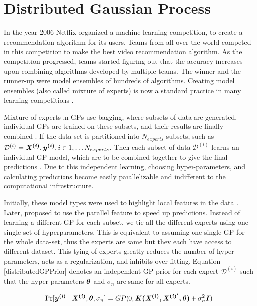 \section{Distributed Gaussian Process}\label{secDgp}
In the year 2006 Netflix organized a machine learning competition, to create a recommendation algorithm for its users. Teams from all over the world competed in this competition to make the best video recommendation algorithm. As the competition progressed, teams started figuring out that the accuracy increases upon combining algorithms developed by multiple teams. The winner and the runner-up were model ensembles of hundreds of algorithms. Creating model ensembles (also called mixture of experts) is now a standard practice in many learning competitions \cite{bauer1998empirical}. 

Mixture of experts in GPs use bagging, where subsets of data are generated, individual GPs are trained on these subsets, and their results are finally combined \cite{chen2009bagging}. If the data set is partitioned  into $N_{experts}$ subsets, such as $\mathcal{D}^{(i)} = {\bm{\mathit{X^{(i)}}}, \boldsymbol{y^{(i)}}}, i \in 1, \ldots N_{experts}$. Then each subset of data $\mathcal{D}^{(i)}$ learns an individual GP model, which are to be combined together to give the final predictions . Due to this independent learning, choosing hyper-parameters, and calculating predictions become easily parallelizable and indifferent to the computational infrastructure. 

\sloppy Initially, these model types were used to highlight local features in the data \cite{rasmussen2002infinite}. Later,  \cite{ng2014hierarchical} proposed to use the parallel feature to speed up predictions. Instead of learning a different GP for each subset, we tie all the different experts using one single set of hyperparameters. This is equivalent to assuming one single GP for the whole data-set, thus the experts are same but they each have access to different dataset. This tying of experts greatly reduces the number of hyper-parameters, acts as a regularization, and inhibits over-fitting. Equation \ref{distributedGPPrior} denotes an independent GP prior for each expert $\mathcal{D}^{(i)}$ such that the hyper-parameters $\boldsymbol{\theta}$ and $\sigma_{n}$ are same for all experts.

\begin{equation}\label{distributedGPPrior}
    \Pr[\boldsymbol{y^{(i)}} \mid \bm{\mathit{X^{(i)}}}, \boldsymbol{\theta}, \sigma_{n}] = GP(0, \bm{\mathit{K(\boldsymbol{X^{(i)}}, X^{(i)'}, \theta)}} + \sigma^{2}_{n}\bm{\mathit{I}}) 
\end{equation}

